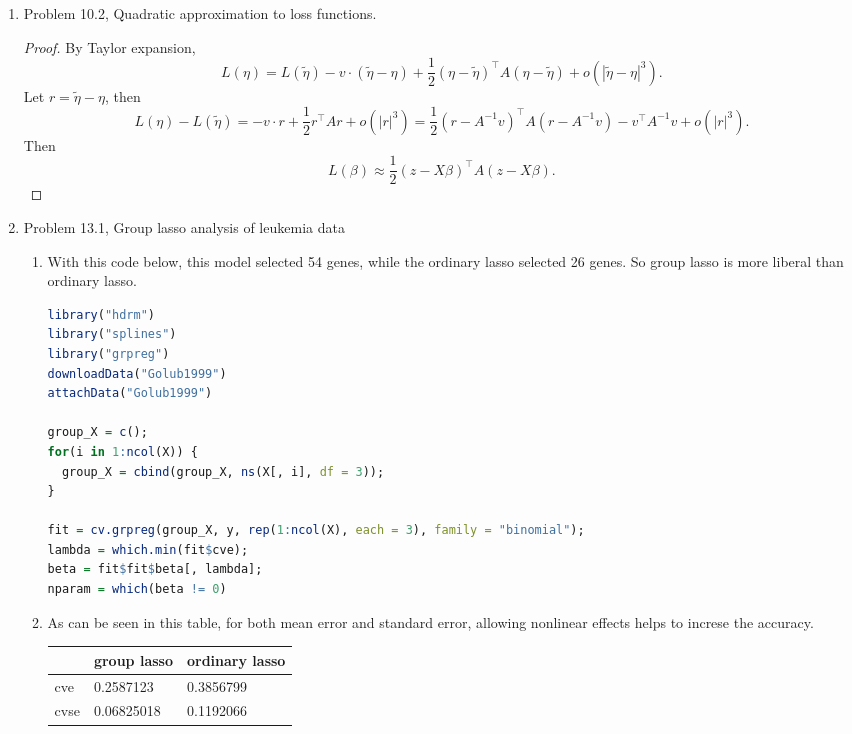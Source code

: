 \documentclass{article}
\begin{document}
\begin{enumerate}
\begin{enumerate}
\end{enumerate}

\item Problem 10.2, Quadratic approximation to loss functions.

\begin{proof}
By Taylor expansion, 
\begin{equation}
L(\eta) = L(\tilde\eta)-v\cdot(\tilde\eta - \eta) + \frac{1}{2}(\eta-\tilde\eta)^\top A(\eta - \tilde\eta) + o(|\tilde\eta - \eta|^3 ).
\end{equation}
Let $r = \tilde\eta-\eta$, then
\begin{equation}
L(\eta) - L(\tilde\eta) = -v\cdot r + \frac{1}{2}r^\top Ar + o(|r|^3) = \frac{1}{2}(r - A^{-1}v)^\top A(r-A^{-1}v) - v^\top A^{-1}v + o(|r|^3).
\end{equation}
Then
\begin{equation}
L(\beta) \approx \frac{1}{2}(z-X\beta)^\top A(z-X\beta).
\end{equation}
\end{proof}

\item Problem 13.1, Group lasso analysis of leukemia data

\begin{enumerate}
\item
With this code below, this model selected 54 genes, while the ordinary lasso selected 26 genes. So group lasso is more liberal than ordinary lasso.
\begin{lstlisting}[language=R]
library("hdrm")
library("splines")
library("grpreg")
downloadData("Golub1999")
attachData("Golub1999")

group_X = c();
for(i in 1:ncol(X)) {
  group_X = cbind(group_X, ns(X[, i], df = 3));
}

fit = cv.grpreg(group_X, y, rep(1:ncol(X), each = 3), family = "binomial");
lambda = which.min(fit$cve);
beta = fit$fit$beta[, lambda];
nparam = which(beta != 0)
\end{lstlisting}

\item
As can be seen in this table, for both mean error and standard error, allowing nonlinear effects helps to increse the accuracy.

\begin{table}[h]
\centering
\begin{tabular}{|l|l|l|}
\hline
     & group lasso & ordinary lasso \\ \hline
cve  & 0.2587123   & 0.3856799      \\ \hline
cvse & 0.06825018  & 0.1192066      \\ \hline
\end{tabular}
\end{table}


\end{enumerate}

\end{enumerate}
\end{document}
